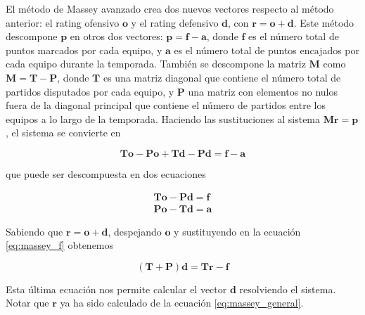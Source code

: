 El método de Massey avanzado crea dos nuevos vectores respecto al método anterior: el rating ofensivo $\mathbf{o}$ y el rating defensivo $\mathbf{d}$, con $\mathbf{r} = \mathbf{o} + \mathbf{d}$. Este método descompone $\mathbf{p}$ en otros dos vectores: $ \mathbf{p} = \mathbf{f} - \mathbf{a}$, donde $\mathbf{f}$ es el número total de puntos marcados por cada equipo, y $\mathbf{a}$ es el número total de puntos encajados por cada equipo durante la temporada. También se descompone la matriz $\mathbf{M}$ como $\mathbf{M} = \mathbf{T} - \mathbf{P}$, donde $\mathbf{T}$ es una matriz diagonal que contiene el número total de partidos disputados por cada equipo, y $\mathbf{P}$ una matriz con elementos no nulos fuera de la diagonal principal que contiene el número de partidos entre los equipos a lo largo de la temporada. Haciendo las sustituciones al sistema $\mathbf{M r } = \mathbf{p}$, el sistema se convierte en

\begin{equation}
\mathbf{T o} - \mathbf{P o} + \mathbf{T d} - \mathbf{P d} = \mathbf{f} - \mathbf{a}
\end{equation}

que puede ser descompuesta en dos ecuaciones

\begin{eqnarray}
\mathbf{T o} - \mathbf{P d} = \mathbf{f}\\ \label{eq:massey_f}
\mathbf{P o} - \mathbf{T d} = \mathbf{a} \label{eq:massey}
\end{eqnarray} 

Sabiendo que $\mathbf{r} = \mathbf{o} + \mathbf{d}$, despejando $\mathbf{o}$ y sustituyendo en la ecuación \ref{eq:massey_f} obtenemos

\begin{equation}
(\mathbf{T} + \mathbf{P})\mathbf{d} = \mathbf{T r} - \mathbf{f} \label{eq:massey_d}
\end{equation}

Esta última ecuación nos permite calcular el vector $\mathbf{d}$ resolviendo el sistema. Notar que $\mathbf{r}$ ya ha sido calculado de la ecuación \ref{eq:massey_general}.

